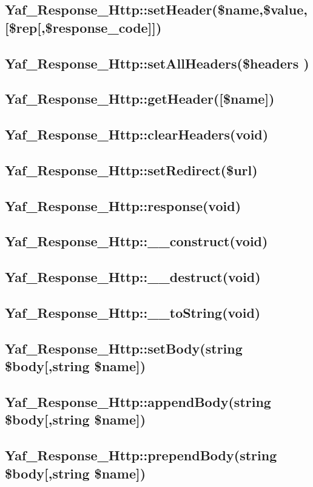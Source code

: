 \subsection{Yaf\_Response\_Http::setHeader(\$name,\$value,[\$rep[,\$response\_code]])}
\subsection{Yaf\_Response\_Http::setAllHeaders(\$headers )}
\subsection{Yaf\_Response\_Http::getHeader([\$name])}
\subsection{Yaf\_Response\_Http::clearHeaders(void)}
\subsection{Yaf\_Response\_Http::setRedirect(\$url)}

\subsection{Yaf\_Response\_Http::response(void)}
\subsection{Yaf\_Response\_Http::\_\_construct(void)}
\subsection{Yaf\_Response\_Http::\_\_destruct(void)}
\subsection{Yaf\_Response\_Http::\_\_toString(void)}
\subsection{Yaf\_Response\_Http::setBody(string \$body[,string \$name])}
\subsection{Yaf\_Response\_Http::appendBody(string \$body[,string \$name])}
\subsection{Yaf\_Response\_Http::prependBody(string \$body[,string \$name])}
